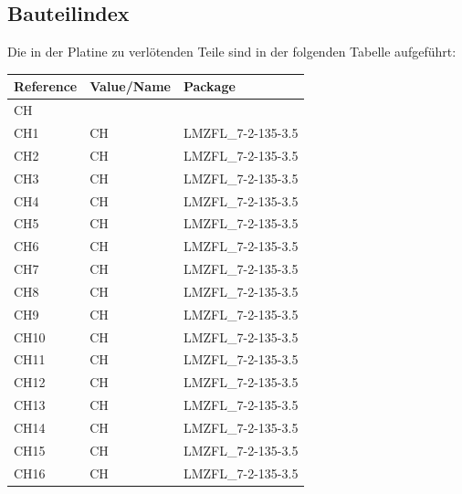\documentclass[paper=a4, open=any]{scrbook}
\begin{document}
			\subsection*{Bauteilindex}

				Die in der Platine zu verlötenden Teile sind in der folgenden Tabelle aufgeführt:

				\begin{longtabu}
					to \textwidth[l]{lX[-1]X}
					Reference & Value/Name             & Package                            \\ \hline\hline
					\endhead
					CH        &                        &                                    \\*
					CH1       & CH                     & LMZFL\_7-2-135-3.5                 \\
					CH2       & CH                     & LMZFL\_7-2-135-3.5                 \\
					CH3       & CH                     & LMZFL\_7-2-135-3.5                 \\
					CH4       & CH                     & LMZFL\_7-2-135-3.5                 \\
					CH5       & CH                     & LMZFL\_7-2-135-3.5                 \\
					CH6       & CH                     & LMZFL\_7-2-135-3.5                 \\
					CH7       & CH                     & LMZFL\_7-2-135-3.5                 \\
					CH8       & CH                     & LMZFL\_7-2-135-3.5                 \\
					CH9       & CH                     & LMZFL\_7-2-135-3.5                 \\
					CH10      & CH                     & LMZFL\_7-2-135-3.5                 \\
					CH11      & CH                     & LMZFL\_7-2-135-3.5                 \\
					CH12      & CH                     & LMZFL\_7-2-135-3.5                 \\
					CH13      & CH                     & LMZFL\_7-2-135-3.5                 \\
					CH14      & CH                     & LMZFL\_7-2-135-3.5                 \\
					CH15      & CH                     & LMZFL\_7-2-135-3.5                 \\
					CH16      & CH                     & LMZFL\_7-2-135-3.5                 \\
					\hline


\end{longtabu}
\end{document}
